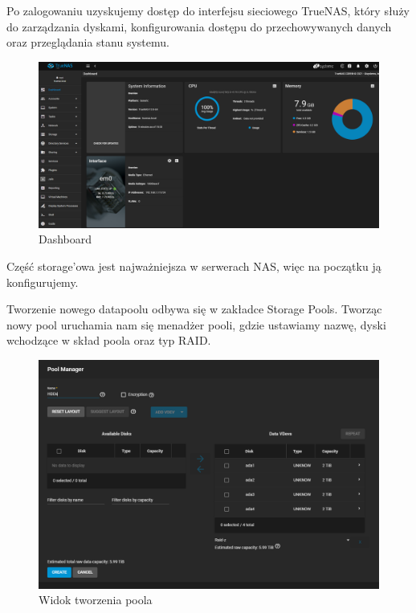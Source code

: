 \documentclass[12pt,a4paper]{article}
\newcommand{\<}{\langle}
\renewcommand{\>}{\rangle}
\theoremstyle{definition}
\begin{document}
Po zalogowaniu uzyskujemy dostęp do interfejsu sieciowego TrueNAS, który służy do zarządzania dyskami, konfigurowania dostępu do przechowywanych danych oraz przeglądania stanu systemu.

\begin{figure}[H]
    \centering
    \includegraphics[width=\linewidth]{img/ss_truenas/17.png}
    \caption{Dashboard}
    \label{dashboard}
\end{figure}

Część storage'owa jest najważniejsza w serwerach NAS, więc na początku ją konfigurujemy.

Tworzenie nowego datapoolu odbywa się w zakładce Storage Pools. Tworząc nowy pool uruchamia nam się menadżer pooli, gdzie ustawiamy nazwę, dyski wchodzące w skład poola oraz typ RAID.

\begin{figure}[H]
    \centering
    \includegraphics[width=\linewidth]{img/ss_truenas/20.png}
    \caption{Widok tworzenia poola}
    \label{pool_manager}
\end{figure}
\end{document}
